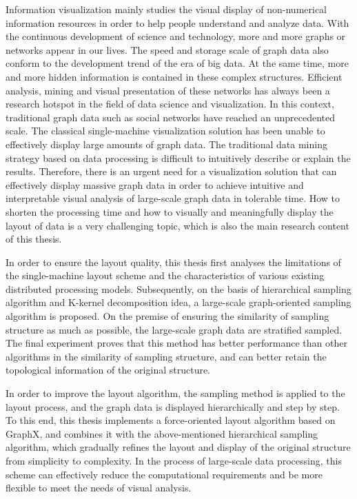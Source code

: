 Information visualization mainly studies the visual display of non-numerical information resources in order to help people understand and analyze data. With the continuous development of science and technology, more and more graphs or networks appear in our lives. The speed and storage scale of graph data also conform to the development trend of the era of big data. At the same time, more and more hidden information is contained in these complex structures. Efficient analysis, mining and visual presentation of these networks has always been a research hotspot in the field of data science and visualization. In this context, traditional graph data such as social networks have reached an unprecedented scale. The classical single-machine visualization solution has been unable to effectively display large amounts of graph data. The traditional data mining strategy based on data processing is difficult to intuitively describe or explain the results. Therefore, there is an urgent need for a visualization solution that can effectively display massive graph data in order to achieve intuitive and interpretable visual analysis of large-scale graph data in tolerable time. How to shorten the processing time and how to visually and meaningfully display the layout of data is a very challenging topic, which is also the main research content of this thesis.

In order to ensure the layout quality, this thesis first analyses the limitations of the single-machine layout scheme and the characteristics of various existing distributed processing models. Subsequently, on the basis of hierarchical sampling algorithm and K-kernel decomposition idea, a large-scale graph-oriented sampling algorithm is proposed. On the premise of ensuring the similarity of sampling structure as much as possible, the large-scale graph data are stratified sampled. The final experiment proves that this method has better performance than other algorithms in the similarity of sampling structure, and can better retain the topological information of the original structure.

In order to improve the layout algorithm, the sampling method is applied to the layout process, and the graph data is displayed hierarchically and step by step. To this end, this thesis implements a force-oriented layout algorithm based on GraphX, and combines it with the above-mentioned hierarchical sampling algorithm, which gradually refines the layout and display of the original structure from simplicity to complexity. In the process of large-scale data processing, this scheme can effectively reduce the computational requirements and be more flexible to meet the needs of visual analysis.

